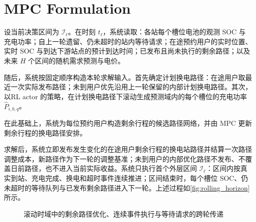 \documentclass[12pt,a4paper,UTF8]{ctexart}
\begin{document}
\section{MPC Formulation}

设当前决策区间为 $\mathcal I_\ell$。在时刻 $t_\ell$，系统读取：各站每个槽位电池的观测 SOC 与充电功率；自上一轮遗留、仍未超时的站内等待请求；在途预约用户的实时位置、实时 SOC 与到达下游站点的预计到达时间；已发布且尚未执行的剩余路径；以及未来 $H$ 个区间的随机需求预测与电价。

随后，系统按固定顺序构造本轮求解输入。首先确定计划换电路径：在途用户取最近一次实际发布路径；未到用户优先沿用上一轮保留的内部计划换电路径。其次，以RL actor 的策略，在计划换电路径下滚动生成预测域内的每个槽位的充电功率 $\widehat P_{i,b,q}$。

在此基础上，系统为每位预约用户构造剩余行程的候选路径网络，并由 MPC 更新剩余行程的换电路径安排。

求解后，系统立即发布发生变化的在途用户剩余行程的换电站路径并结算一次路径调整成本，新路径作为下一轮的调整基准；未到用户的内部优化路径不发布、不覆盖日前路径，也不进入当前实际收益。系统只执行首个外层区间 $\mathcal I_\ell$：区间内按真实到站、充电完成、换电和超时事件连续推进；区间结束时，每个槽位 SOC、仍未超时的等待队列与已发布剩余路径进入下一轮。上述过程如\autoref{fig:rolling_horizon}所示。

\begin{figure}[!htbp]
  \centering
  \caption{滚动时域中的剩余路径优化、连续事件执行与等待请求的跨轮传递}
  \label{fig:rolling_horizon}
\end{figure}
\end{document}
